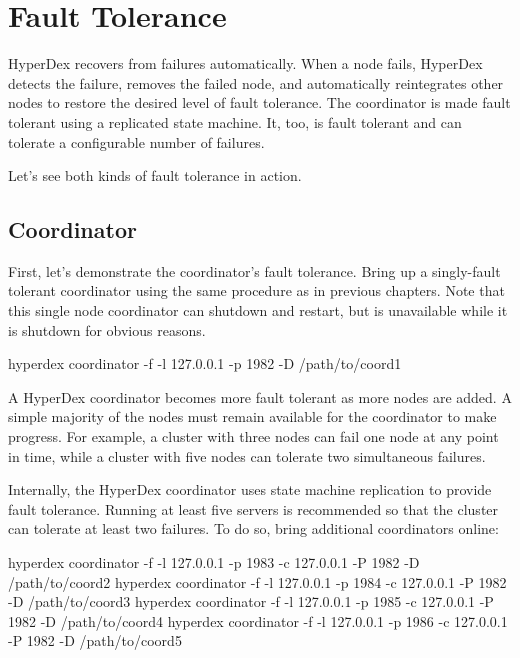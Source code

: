 \chapter{Fault Tolerance}
\label{chap:fault-tolerance}

HyperDex recovers from failures automatically.  When a node fails, HyperDex
detects the failure, removes the failed node, and automatically reintegrates
other nodes to restore the desired level of fault tolerance.  The coordinator is
made fault tolerant using a replicated state machine.  It, too, is fault
tolerant and can tolerate a configurable number of failures.

Let's see both kinds of fault tolerance in action.

\section{Coordinator}
\label{chap:fault-tolerance:coordinator}

First, let's demonstrate the coordinator's fault tolerance.  Bring up a
singly-fault tolerant coordinator using the same procedure as in previous
chapters.  Note that this single node coordinator can shutdown and restart, but
is unavailable while it is shutdown for obvious reasons.

\begin{consolecode}
hyperdex coordinator -f -l 127.0.0.1 -p 1982 -D /path/to/coord1
\end{consolecode}

A HyperDex coordinator becomes more fault tolerant as more nodes are added.  A
simple majority of the nodes must remain available for the coordinator to make
progress.  For example, a cluster with three nodes can fail one node at any
point in time, while a cluster with five nodes can tolerate two simultaneous
failures.

Internally, the HyperDex coordinator uses state machine replication to provide
fault tolerance.  Running at least five servers is recommended so that the
cluster can tolerate at least two failures.  To do so, bring additional
coordinators online:

\begin{consolecode}
hyperdex coordinator -f -l 127.0.0.1 -p 1983 -c 127.0.0.1 -P 1982 -D /path/to/coord2
hyperdex coordinator -f -l 127.0.0.1 -p 1984 -c 127.0.0.1 -P 1982 -D /path/to/coord3
hyperdex coordinator -f -l 127.0.0.1 -p 1985 -c 127.0.0.1 -P 1982 -D /path/to/coord4
hyperdex coordinator -f -l 127.0.0.1 -p 1986 -c 127.0.0.1 -P 1982 -D /path/to/coord5
\end{consolecode}

